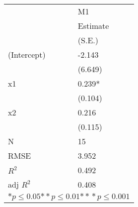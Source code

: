 \begin{tabular}{*{2}{l}}
\hline
                  & M1   \tabularnewline
                   &Estimate \tabularnewline
                 &(S.E.) \tabularnewline
 \hline
 \hline
   (Intercept)     &-2.143 \tabularnewline
                 &(6.649)  \tabularnewline
   x1              &0.239* \tabularnewline
                 &(0.104)  \tabularnewline
   x2              &0.216 \tabularnewline
                 &(0.115)  \tabularnewline
 \hline
 N                 &15       \tabularnewline
 RMSE             &3.952   \tabularnewline
 $R^2$             &0.492   \tabularnewline
 adj $R^2$         &0.408   \tabularnewline
 \hline
\hline
 
 \multicolumn{2}{c}{${*  p}\le 0.05$${*\!\!*  p}\le 0.01$${*\!\!*\!\!*  p}\le 0.001$}\tabularnewline
 \end{tabular}